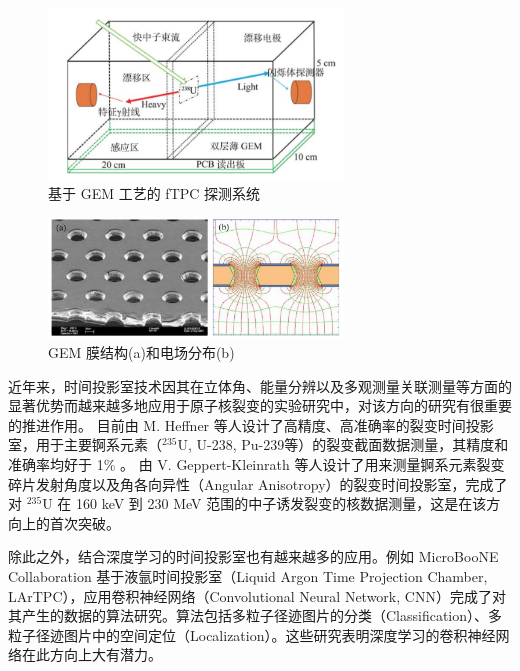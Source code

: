 \documentclass[AutoFakeBold]{LZUThesis}
\begin{document}
\begin{figure}[H]
    \centering
    \includegraphics[width=0.7\textwidth]{figures/GEM-TPC.png}
    \caption{基于 GEM 工艺的 fTPC 探测系统\cite{魏康2019基于GEM工艺的裂变时间投影室中裂变碎片的讨论}}
    \label{fig_GEM-TPC}
\end{figure}

\begin{figure}[H]
    \centering
    \includegraphics[width=0.7\textwidth]{figures/GEM.png}
    \caption{GEM 膜结构(a)和电场分布(b)}
    \label{fig_GEM}
\end{figure}


近年来，时间投影室技术因其在立体角、能量分辨以及多观测量关联测量等方面的显著优势而越来越多地应用于原子核裂变的实验研究中，对该方向的研究有很重要的推进作用。
目前由 M. Heffner 等人设计了高精度、高准确率的裂变时间投影室，用于主要锕系元素（$^{235}$U, U-238, Pu-239等）的裂变截面数据测量，其精度和准确率均好于 1\% \cite{heffner2014time}。
由 V. Geppert-Kleinrath 等人设计了用来测量锕系元素裂变碎片发射角度以及角各向异性（Angular Anisotropy）的裂变时间投影室，完成了对 $^{235}$U 在 160 keV 到 230 MeV 范围的中子诱发裂变的核数据测量，这是在该方向上的首次突破\cite{collaboration2019fission, hensle2020neutron}。

除此之外，结合深度学习的时间投影室也有越来越多的应用。例如 MicroBooNE Collaboration 基于液氩时间投影室（Liquid Argon Time Projection Chamber, LArTPC），应用卷积神经网络（Convolutional Neural Network, CNN）完成了对其产生的数据的算法研究。算法包括多粒子径迹图片的分类（Classification）、多粒子径迹图片中的空间定位（Localization）\cite{abratenko2020convolutional}。这些研究表明深度学习的卷积神经网络在此方向上大有潜力。
\end{document}

